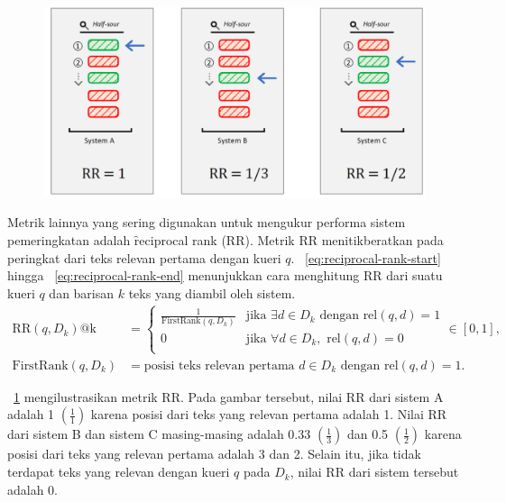         \begin{figure}[!ht]
            \centering
            \includegraphics[width=1\textwidth]{assets/pics/rr.png}
            \label{fig:reciprocal-rank}
        \end{figure}
        Metrik lainnya yang sering digunakan untuk mengukur performa sistem pemeringkatan adalah \f{reciprocal rank} (RR). Metrik RR menitikberatkan pada peringkat dari teks relevan pertama dengan kueri $q$. \equ~\ref{eq:reciprocal-rank-start} hingga \equ~\ref{eq:reciprocal-rank-end} menunjukkan cara menghitung RR dari suatu kueri $q$ dan barisan $k$ teks yang diambil oleh sistem.
        \begin{align}
            \text{RR}(q, D_k)\text{@k} &= \begin{cases}
                \label{eq:reciprocal-rank-start}
                \frac{1}{\text{FirstRank}(q, D_k)} & \text{jika } \exists d \in D_k \text{ dengan } \text{rel}(q, d) = 1 \\        
                0 & \text{jika } \forall d \in D_k, \text{ rel}(q, d) = 0 \\
                \end{cases} \in [0, 1], \\
                \label{eq:reciprocal-rank-end}
                \text{FirstRank}(q,D_k) &= \text{posisi teks relevan pertama } d\in D_k \text{ dengan } \text{rel}(q, d) = 1.
        \end{align}

        \pic~\ref{fig:reciprocal-rank} mengilustrasikan metrik RR. Pada gambar tersebut, nilai RR dari sistem A adalah 1 $(\frac{1}{1})$ karena posisi dari teks yang relevan pertama adalah 1. Nilai RR dari sistem B dan sistem C masing-masing adalah  0.33 $(\frac{1}{3})$ dan 0.5 $(\frac{1}{2})$ karena posisi dari teks yang relevan pertama adalah 3 dan 2. Selain itu, jika tidak terdapat teks yang relevan dengan kueri $q$ pada $D_k$, nilai RR dari sistem tersebut adalah 0. 

